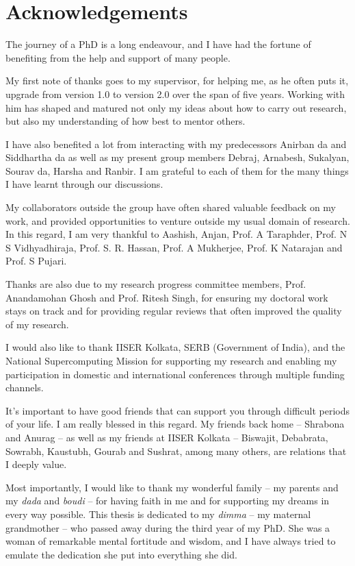 \chapter*{Acknowledgements}

The journey of a PhD is a long endeavour, and I have had the fortune of benefiting from the help and support of many people.
\vspace{1em}

My first note of thanks goes to my supervisor, for helping me, as he often puts it, upgrade from version 1.0 to version 2.0 over the span of five years. Working with him has shaped and matured not only my ideas about how to carry out research, but also my understanding of how best to mentor others.
\vspace{1em}

I have also benefited a lot from interacting with my predecessors Anirban da and Siddhartha da as well as my present group members Debraj, Arnabesh, Sukalyan, Sourav da, Harsha and Ranbir. I am grateful to each of them for the many things I have learnt through our discussions.
\vspace{1em}

My collaborators outside the group have often shared valuable feedback on my work, and provided opportunities to venture outside my usual domain of research. In this regard, I am very thankful to Aashish, Anjan, Prof. A Taraphder, Prof. N S Vidhyadhiraja, Prof. S. R. Hassan, Prof. A Mukherjee, Prof. K Natarajan and Prof. S Pujari.
\vspace{1em}

Thanks are also due to my research progress committee members, Prof. Anandamohan Ghosh and Prof. Ritesh Singh, for ensuring my doctoral work stays on track and for providing regular reviews that often improved the quality of my research.
\vspace{1em}

I would also like to thank IISER Kolkata, SERB (Government of India), and the National Supercomputing Mission for supporting my research and enabling my participation in domestic and international conferences through multiple funding channels.
\vspace{1em}

It's important to have good friends that can support you through difficult periods of your life. I am really blessed in this regard. My friends back home -- Shrabona and Anurag -- as well as my friends at IISER Kolkata -- Biswajit, Debabrata, Sowrabh, Kaustubh, Gourab and Sushrat, among many others, are relations that I deeply value.
\vspace{1em}

Most importantly, I would like to thank my wonderful family -- my parents and my {\it dada} and {\it boudi} -- for having faith in me and for supporting my dreams in every way possible. This thesis is dedicated to my {\it dimma} -- my maternal grandmother -- who passed away during the third year of my PhD. She was a woman of remarkable mental fortitude and wisdom, and I have always tried to emulate the dedication she put into everything she did.
